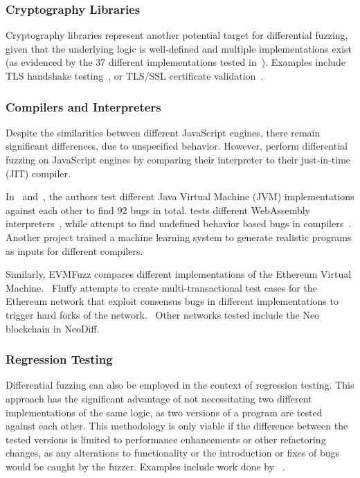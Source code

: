 \documentclass{article}
\let\savedCite=\cite
\renewcommand{\cite}{\unskip~\savedCite}
\begin{document}
\begin{multicols}{2}
    \subsubsection{Cryptography Libraries}

    Cryptography libraries represent another potential target for differential fuzzing, given that the underlying logic is well-defined and multiple implementations exist (as evidenced by the 37 different implementations tested in\cite{TLS}). Examples include TLS handshake testing\cite{ExploitingDissent, TLS}, or TLS/SSL certificate validation\cite{NEZHA}.

    \subsubsection{Compilers and Interpreters}

    Despite the similarities between different JavaScript engines, there remain significant differences, due to unspecified behavior. However, \citeauthor{JIT-Picking} perform differential fuzzing on JavaScript engines by comparing their interpreter to their just-in-time (JIT) compiler.\cite{JIT-Picking}

    In\cite{JVM} and\cite{JVM2}, the authors test different Java Virtual Machine (JVM) implementations against each other to find 92 bugs in total. \citeauthor{WASM} tests different WebAssembly interpreters\cite{WASM}, while \citeauthor{UndefinedBehavior} attempt to find undefined behavior based bugs in compilers\cite{UndefinedBehavior}. Another project trained a machine learning system to generate realistic programs as inputs for different compilers.\cite{CompilerDL}

    Similarly, EVMFuzz compares different implementations of the Ethereum Virtual Machine.\cite{EVMFuzz} Fluffy attempts to create multi-transactional test cases for the Ethereum network that exploit consensus bugs in different implementations to trigger hard forks of the network.\cite{Fluffy} Other networks tested include the Neo blockchain in NeoDiff.\cite{NeoDiff}

    \subsubsection{Regression Testing}

    Differential fuzzing can also be employed in the context of regression testing. This approach has the significant advantage of not necessitating two different implementations of the same logic, as two versions of a program are tested against each other. This methodology is only viable if the difference between the tested versions is limited to performance enhancements or other refactoring changes, as any alterations to functionality or the introduction or fixes of bugs would be caught by the fuzzer. Examples include work done by \citeauthor{HyDiff}\cite{HyDiff}.


\end{multicols}
\end{document}
